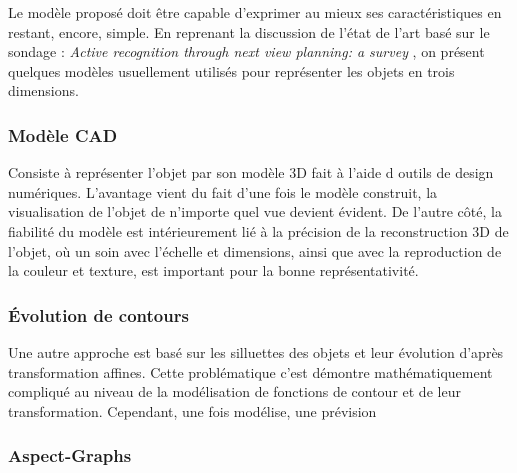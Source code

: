 Le modèle proposé doit être capable d'exprimer au
mieux ses caractéristiques en restant, encore, simple.  En reprenant la
discussion de l'état de l'art basé sur le sondage : 
\textit{Active recognition through next view planning: a survey}
, on présent quelques modèles usuellement
utilisés pour représenter les objets en trois dimensions.

\subsubsection{Modèle CAD}

Consiste à représenter l'objet par son modèle 3D fait à l'aide d
outils de design numériques. L'avantage vient du fait d'une fois le
modèle construit, la visualisation de l'objet de n'importe quel vue
devient évident. De l'autre côté, la fiabilité du modèle est
intérieurement lié à la précision de la reconstruction 3D de l'objet,
où un soin avec l'échelle et dimensions, ainsi que avec la
reproduction de la couleur et texture, est important pour la bonne
représentativité.

\subsubsection{Évolution de contours}

Une autre approche est basé sur les silluettes des objets et leur
évolution d'après transformation affines. Cette problématique c'est
démontre mathématiquement compliqué au niveau de la modélisation de
fonctions de contour et de leur transformation. Cependant, une fois
modélise, une prévision


\subsubsection{Aspect-Graphs}

